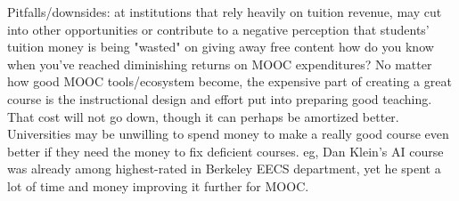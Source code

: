 Pitfalls/downsides: at institutions that rely heavily on tuition
revenue, may cut into other opportunities or contribute to a negative
perception that students' tuition money is being "wasted" on giving away
free content how do you know when you've reached diminishing returns on
MOOC expenditures?  No matter how good MOOC tools/ecosystem become, the
expensive part of creating a great course is the instructional design
and effort put into preparing good teaching.  That cost will not go
down, though it can perhaps be amortized better.  Universities may be
unwilling to spend money to make a really good course even better if
they need the money to fix deficient courses.  eg, Dan Klein's AI course
was already among highest-rated in Berkeley EECS department, yet he
spent a lot of time and money improving it further for MOOC.

